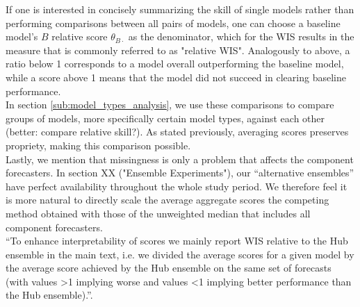 If one is interested in concisely summarizing the skill of single models rather than performing comparisons between all pairs of models, one can choose a baseline model's $B$ relative score $\theta_{B\cdot}$ as the denominator, which for the WIS results in the measure that is commonly referred to as "relative WIS". Analogously to above, a ratio below 1 corresponds to a model overall outperforming the baseline model, while a score above 1 means that the model did not succeed in clearing baseline performance.\\
In section \ref{sub:model_types_analysis}, we use these comparisons to compare groups of models, more specifically certain model types, against each other (better: compare relative skill?). As stated previously, averaging scores preserves propriety, making this comparison possible.\\
Lastly, we mention that missingness is only a problem that affects the component forecasters. In section XX ("Ensemble Experiments"), our ``alternative ensembles'' have perfect availability throughout the whole study period. We therefore feel it is more natural to directly scale the average aggregate scores the competing method obtained with those of the unweighted median that includes all component forecasters.\\
``To enhance interpretability of scores we mainly report WIS relative to the Hub ensemble in the main text, i.e. we divided
the average scores for a given model by the average score achieved by the Hub ensemble on the same set of
forecasts (with values >1 implying worse and values <1 implying better performance than the Hub ensemble).''\cite{bosse_comparing_2021-1}.
